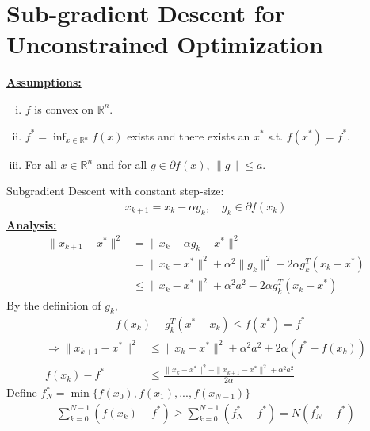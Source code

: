 \documentclass[11pt]{elegantbook}
\begin{document}
\section{Sub-gradient Descent for Unconstrained Optimization}
\textbf{\underline{Assumptions:}}
\begin{enumerate}[(i)]
    \item $f$ is convex on $\mathbb{R}^n$.
    \item $f^*=\inf_{x\in \mathbb{R}^n}f(x)$ exists and there exists an $x^*$ s.t. $f(x^*)=f^*$.
    \item For all $x\in \mathbb{R}^n$ and for all $g\in \partial f(x)$, $\|g\|\leq a$.
\end{enumerate}
Subgradient Descent with constant step-size:
\begin{equation}
    \begin{aligned}
        x_{k+1}=x_k-\alpha g_k,\quad g_k\in \partial f(x_k)
    \end{aligned}
    \nonumber
\end{equation}
\textbf{\underline{Analysis:}}
\begin{equation}
    \begin{aligned}
        \|x_{k+1}-x^*\|^2&=\|x_k-\alpha g_k-x^*\|^2\\
        &=\|x_k-x^*\|^2+\alpha^2\|g_k\|^2-2\alpha g_k^T(x_k-x^*)\\
        &\leq \|x_k-x^*\|^2+\alpha^2a^2-2\alpha g_k^T(x_k-x^*)
    \end{aligned}
    \nonumber
\end{equation}
By the definition of $g_k$,
\begin{equation}
    \begin{aligned}
        &f(x_k)+g_k^T(x^*-x_k)\leq f(x^*)=f^*
    \end{aligned}
    \nonumber
\end{equation}
\begin{equation}
    \begin{aligned}
        \Rightarrow  \|x_{k+1}-x^*\|^2&\leq \|x_k-x^*\|^2+\alpha^2a^2+2\alpha (f^*-f(x_k))\\
        f(x_k)-f^*&\leq \frac{\|x_k-x^*\|^2-\|x_{k+1}-x^*\|^2+\alpha^2a^2}{2\alpha}
    \end{aligned}
    \nonumber
\end{equation}
Define $f_N^*=\min\{f(x_0),f(x_1),...,f(x_{N-1})\}$
\begin{equation}
    \begin{aligned}
        \sum_{k=0}^{N-1}(f(x_k)-f^*)\geq \sum_{k=0}^{N-1}(f_N^*-f^*)=N(f_N^*-f^*)
    \end{aligned}
    \nonumber
\end{equation}
\end{document}
